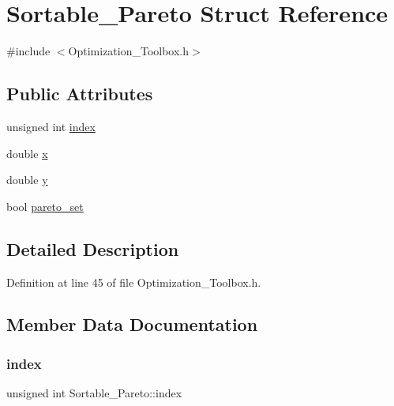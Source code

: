 \hypertarget{struct_sortable___pareto}{}\section{Sortable\+\_\+\+Pareto Struct Reference}
\label{struct_sortable___pareto}


{\ttfamily \#include $<$Optimization\+\_\+\+Toolbox.\+h$>$}

\subsection*{Public Attributes}
\begin{DoxyCompactItemize}
\item 
unsigned int \mbox{\hyperlink{struct_sortable___pareto_ad86fc6339ac5d0a90214bcfe29f2d878}{index}}
\item 
double \mbox{\hyperlink{struct_sortable___pareto_ae5c3b332c8a192961de0a085d59432da}{x}}
\item 
double \mbox{\hyperlink{struct_sortable___pareto_a00f29310c191ed10f9a6b58977be1bd7}{y}}
\item 
bool \mbox{\hyperlink{struct_sortable___pareto_a0e2e26ce019397c46470e63af05fc5c7}{pareto\+\_\+set}}
\end{DoxyCompactItemize}


\subsection{Detailed Description}


Definition at line 45 of file Optimization\+\_\+\+Toolbox.\+h.



\subsection{Member Data Documentation}
\mbox{\label{struct_sortable___pareto_ad86fc6339ac5d0a90214bcfe29f2d878}} 
\subsubsection{\texorpdfstring{index}{index}}
{\footnotesize\ttfamily unsigned int Sortable\+\_\+\+Pareto\+::index}



